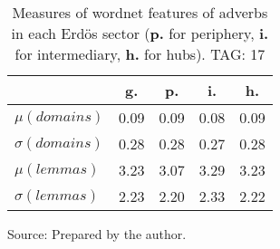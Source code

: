 \begin{table}[h!]
\begin{center}
\caption{Measures of wordnet features of adverbs in each Erd\"os sector ({{\bf p.}} for periphery, {{\bf i.}} for intermediary, {{\bf h.}} for hubs). TAG: 17}
	\label{tab:wnr}
\begin{tabular}{| l || c | c | c | c |}\hline
 & {\bf g.} & {\bf p.} & {\bf i.} & {\bf h.} \\\hline\hline
$\mu(domains)$ & 0.09  & 0.09  & 0.08  & 0.09 \\
$\sigma(domains)$ & 0.28  & 0.28  & 0.27  & 0.28 \\\hline
$\mu(lemmas)$ & 3.23  & 3.07  & 3.29  & 3.23 \\
$\sigma(lemmas)$ & 2.23  & 2.20  & 2.33  & 2.22 \\\hline
\end{tabular}
\begin{flushleft}
		Source: Prepared by the author.\
\end{flushleft}
\end{center}
\end{table}

